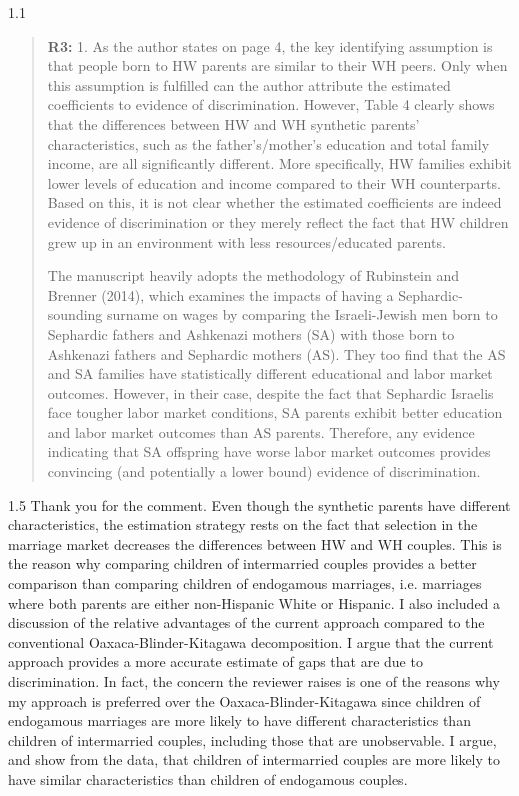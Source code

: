 \documentclass[12pt,english]{article}
\newcommand{\rrquote}{1.1}
\newcommand{\rrxspc}{1.5}
\begin{document}
    \begin{spacing}{\rrquote}
        \begin{quotation}
        \textbf{R3: } 1. As the author states on page 4, the key identifying assumption is that people born to HW parents are similar to their WH peers. Only when this assumption is fulfilled can the author attribute the estimated coefficients to evidence of discrimination. However, Table 4 clearly shows that the differences between HW and WH synthetic parents’ characteristics, such as the father’s/mother’s education and total family income, are all significantly different. More specifically, HW families exhibit lower levels of education and income compared to their WH counterparts. Based on this, it is not clear whether the estimated coefficients are indeed evidence of discrimination or they merely reflect the fact that HW children grew up in an environment with less resources/educated parents.

        The manuscript heavily adopts the methodology of Rubinstein and Brenner (2014), which examines the impacts of having a Sephardic-sounding surname on wages by comparing the Israeli-Jewish men born to Sephardic fathers and Ashkenazi mothers (SA) with those born to Ashkenazi fathers and Sephardic mothers (AS). They too find that the AS and SA families have statistically different educational and labor market outcomes. However, in their case, despite the fact that Sephardic Israelis face tougher labor market conditions, SA parents exhibit better education and labor market outcomes than AS parents. Therefore, any evidence indicating that SA offspring have worse labor market outcomes provides convincing (and potentially a lower bound) evidence of discrimination.

        \end{quotation}
        \end{spacing}
        
        \begin{spacing}{\rrxspc}
            Thank you for the comment. Even though the synthetic parents have different characteristics, the estimation strategy rests on the fact that selection in the marriage market decreases the differences between HW and WH couples. This is the reason why comparing children of intermarried couples provides a better comparison than comparing children of endogamous marriages, i.e. marriages where both parents are either non-Hispanic White or Hispanic. I also included a discussion of the relative advantages of the current approach compared to the conventional Oaxaca-Blinder-Kitagawa decomposition. I argue that the current approach provides a more accurate estimate of gaps that are due to discrimination. In fact, the concern the reviewer raises is one of the reasons why my approach is preferred over the Oaxaca-Blinder-Kitagawa since children of endogamous marriages are more likely to have different characteristics than children of intermarried couples, including those that are unobservable. I argue, and show from the data, that children of intermarried couples are more likely to have similar characteristics than children of endogamous couples.
    \end{spacing}
\end{document}

